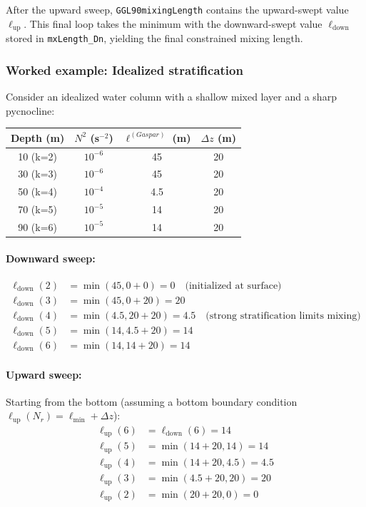 \documentclass[12pt,letterpaper]{article}
\begin{document}
After the upward sweep, \verb|GGL90mixingLength| contains the upward-swept value $\ell_{\text{up}}$. This final loop takes the minimum with the downward-swept value $\ell_{\text{down}}$ stored in \verb|mxLength_Dn|, yielding the final constrained mixing length.

\subsubsection{Worked example: Idealized stratification}

Consider an idealized water column with a shallow mixed layer and a sharp pycnocline:

\begin{center}
\begin{tabular}{cccc}
\toprule
Depth (m) & $N^2$ (s$^{-2}$) & $\ell^{(Gaspar)}$ (m) & $\Delta z$ (m) \\
\midrule
10 (k=2)  & $10^{-6}$ & 45 & 20 \\
30 (k=3)  & $10^{-6}$ & 45 & 20 \\
50 (k=4)  & $10^{-4}$ & 4.5 & 20 \\
70 (k=5)  & $10^{-5}$ & 14 & 20 \\
90 (k=6)  & $10^{-5}$ & 14 & 20 \\
\bottomrule
\end{tabular}
\end{center}

\paragraph{Downward sweep:}
\begin{align*}
\ell_{\text{down}}(2) &= \min(45, 0 + 0) = 0 \quad \text{(initialized at surface)} \\
\ell_{\text{down}}(3) &= \min(45, 0 + 20) = 20 \\
\ell_{\text{down}}(4) &= \min(4.5, 20 + 20) = 4.5 \quad \text{(strong stratification limits mixing)} \\
\ell_{\text{down}}(5) &= \min(14, 4.5 + 20) = 14 \\
\ell_{\text{down}}(6) &= \min(14, 14 + 20) = 14
\end{align*}

\paragraph{Upward sweep:}
Starting from the bottom (assuming a bottom boundary condition $\ell_{\text{up}}(N_r) = \ell_{\text{min}} + \Delta z$):
\begin{align*}
\ell_{\text{up}}(6) &= \ell_{\text{down}}(6) = 14 \\
\ell_{\text{up}}(5) &= \min(14 + 20, 14) = 14 \\
\ell_{\text{up}}(4) &= \min(14 + 20, 4.5) = 4.5 \\
\ell_{\text{up}}(3) &= \min(4.5 + 20, 20) = 20 \\
\ell_{\text{up}}(2) &= \min(20 + 20, 0) = 0
\end{align*}
\end{document}
